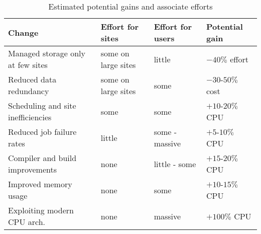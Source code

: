 \begin{table}
  \centering
  \caption{Estimated potential gains and associate efforts}
  \label{tab:pgain}
  \begin{tabular}{llll}
    \hline
    Change & Effort for sites & Effort for users & Potential gain \\\hline
    Managed storage only at few sites & some on large sites & little & $-40\%$ effort \\
    Reduced data redundancy & some on large sites & some & $-30$-$50\%$ cost \\
    Scheduling and site inefficiencies & some & some & $+10$-$20\%$ CPU  \\
    Reduced job failure rates & little & some - massive & $+5$-$10\%$ CPU \\
    Compiler and build improvements & none &  little - some & $+15$-$20\%$ CPU \\
    Improved memory usage & none & some &  $+10$-$15\%$ CPU \\ 
    Exploiting modern CPU arch. &  none & massive & $+100\%$ CPU \\\hline
  \end{tabular}
\end{table}
